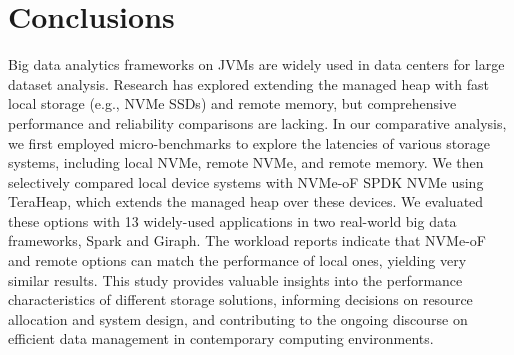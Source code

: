 \section{Conclusions}
Big data analytics frameworks on JVMs are widely used in data centers for large dataset analysis. Research has explored extending the managed heap with fast local storage (e.g., NVMe SSDs) and remote memory, but comprehensive performance and reliability comparisons are lacking. In our comparative analysis, we first employed micro-benchmarks to explore the latencies of various storage systems, including local NVMe, remote NVMe, and remote memory. We then selectively compared local device systems with NVMe-oF SPDK NVMe using TeraHeap, which extends the managed heap over these devices. We evaluated these options with 13 widely-used applications in two real-world big data frameworks, Spark and Giraph. The workload reports indicate that NVMe-oF and remote options can match the performance of local ones, yielding very similar results. This study provides valuable insights into the performance characteristics of different storage solutions, informing decisions on resource allocation and system design, and contributing to the ongoing discourse on efficient data management in contemporary computing environments.